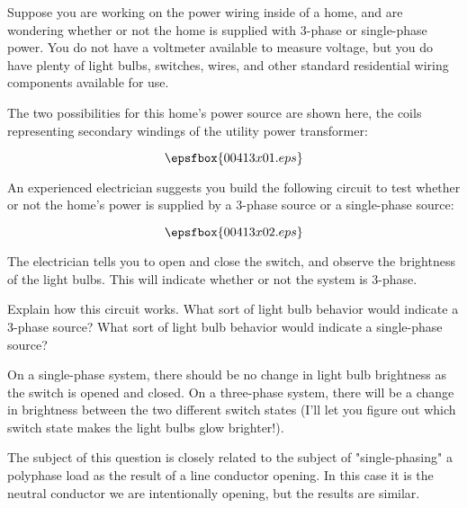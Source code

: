 

Suppose you are working on the power wiring inside of a home, and are wondering whether or not the home is supplied with 3-phase or single-phase power.  You do not have a voltmeter available to measure voltage, but you do have plenty of light bulbs, switches, wires, and other standard residential wiring components available for use.

The two possibilities for this home's power source are shown here, the coils representing secondary windings of the utility power transformer:

$$\epsfbox{00413x01.eps}$$

An experienced electrician suggests you build the following circuit to test whether or not the home's power is supplied by a 3-phase source or a single-phase source:

$$\epsfbox{00413x02.eps}$$

The electrician tells you to open and close the switch, and observe the brightness of the light bulbs.  This will indicate whether or not the system is 3-phase.

Explain how this circuit works.  What sort of light bulb behavior would indicate a 3-phase source?  What sort of light bulb behavior would indicate a single-phase source?







On a single-phase system, there should be no change in light bulb brightness as the switch is opened and closed.  On a three-phase system, there will be a change in brightness between the two different switch states (I'll let you figure out which switch state makes the light bulbs glow brighter!).







The subject of this question is closely related to the subject of "single-phasing" a polyphase load as the result of a line conductor opening.  In this case it is the neutral conductor we are intentionally opening, but the results are similar.





